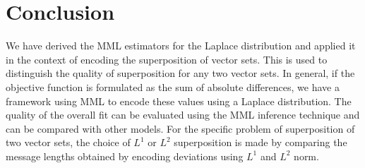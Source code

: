 \documentclass[wcp]{jmlr}
\begin{document}
\section{Conclusion}
We have derived the MML estimators for the Laplace distribution and applied it
in the context of encoding the superposition of vector sets. This is used to
distinguish the quality of superposition for any two vector sets. 
In general, if the objective function is formulated as the sum of absolute differences,
we have a framework using MML to encode these values using 
a Laplace distribution. The quality of the overall fit can be evaluated using the
MML inference technique and can be compared with other models.
For the specific problem of superposition of two vector sets, the choice of $L^1$ or $L^2$
superposition is made by comparing the message lengths obtained by encoding deviations
using $L^1$ and $L^2$ norm.



\end{document}
